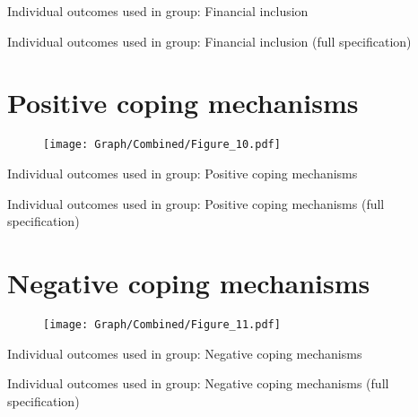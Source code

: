\documentclass[10pt,a4paper]{article}
\begin{document}
\begin{table}[H]\centering\caption{Individual outcomes used in group: Financial inclusion }
\resizebox{\textwidth}{!}{}
\end{table}
\begin{table}[H]\centering\caption{Individual outcomes used in group: Financial inclusion (full specification)}
\resizebox{\textwidth}{!}{}
\end{table}
\pagebreak
\section{Positive coping mechanisms}
\begin{table}[H]\centering

\end{table}
\begin{figure}[H]\centering
\texttt{[image: Graph/Combined/Figure\_10.pdf]}
\caption{} \label{fig:Fig_10}
\end{figure}

\begin{table}[H]\centering\caption{Individual outcomes used in group: Positive coping mechanisms }
\resizebox{\textwidth}{!}{}
\end{table}
\begin{table}[H]\centering\caption{Individual outcomes used in group: Positive coping mechanisms (full specification)}
\resizebox{\textwidth}{!}{}
\end{table}
\pagebreak
\section{Negative coping mechanisms}
\begin{table}[H]\centering

\end{table}
\begin{figure}[H]\centering
\texttt{[image: Graph/Combined/Figure\_11.pdf]}
\caption{} \label{fig:Fig_11}
\end{figure}

\begin{table}[H]\centering\caption{Individual outcomes used in group: Negative coping mechanisms }
\resizebox{\textwidth}{!}{}
\end{table}
\begin{table}[H]\centering\caption{Individual outcomes used in group: Negative coping mechanisms (full specification)}
\resizebox{\textwidth}{!}{}
\end{table}
\pagebreak
\end{document}

